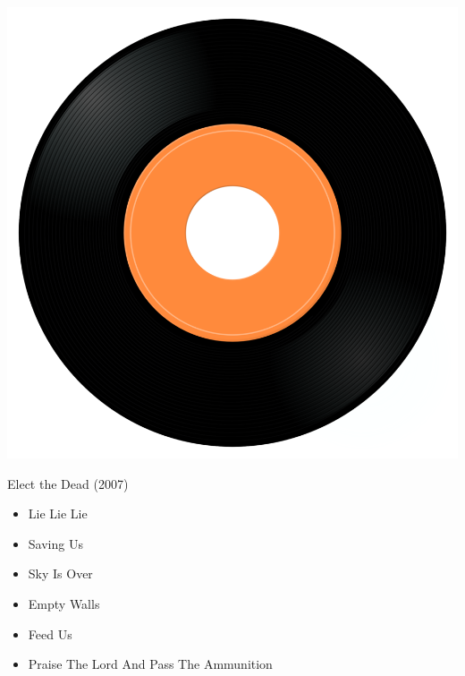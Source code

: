 \begin{minipage}[t]{0.25\textwidth}
\captionsetup{type=figure}
\includegraphics[width=\textwidth]{Images/cover.png}
\caption*{Elect the Dead (2007)}
\end{minipage}
\begin{minipage}[t]{0.25\textwidth}\vspace{0pt}
\begin{itemize}[nosep,leftmargin=1em,labelwidth=*,align=left]
	\setlength{\itemsep}{0pt}
	\item Lie Lie Lie
	\item Saving Us
	\item Sky Is Over
	\item Empty Walls
	\item Feed Us
	\item Praise The Lord And Pass The Ammunition
\end{itemize}
\end{minipage}
